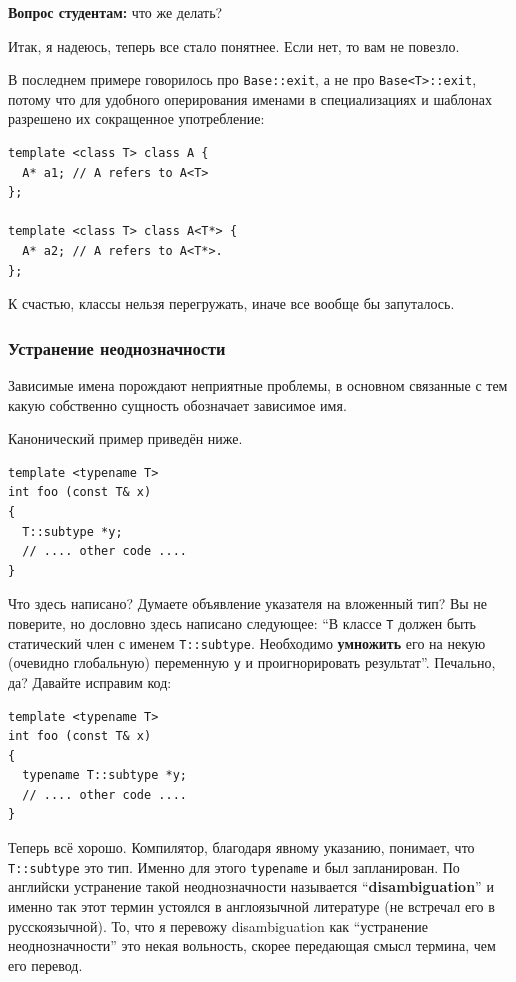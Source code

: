 \documentclass[a4paper,12pt,oneside]{article}
\newif\ifanswers
\begin{document}
\textbf{Вопрос студентам:} что же делать?

\ifanswers
Правильный ответ: сделать \lstinline!exit! зависимым именем, например явно употребив \lstinline!Base::exit()!
\fi

Итак, я надеюсь, теперь все стало понятнее. Если нет, то вам не повезло.

В последнем примере говорилось про \lstinline!Base::exit!, а не про \lstinline!Base<T>::exit!, потому что для удобного оперирования именами в специализациях и шаблонах разрешено их сокращенное употребление:

\begin{lstlisting}
template <class T> class A {
  A* a1; // A refers to A<T>
};

template <class T> class A<T*> {
  A* a2; // A refers to A<T*>.
};
\end{lstlisting}

К счастью, классы нельзя перегружать, иначе все вообще бы запуталось.

\subsubsection{Устранение неоднозначности}\label{FriendTypename}

Зависимые имена порождают неприятные проблемы, в основном связанные с тем какую собственно сущность обозначает зависимое имя.

Канонический пример приведён ниже.

\begin{lstlisting}
template <typename T>
int foo (const T& x)
{
  T::subtype *y;
  // .... other code ....
}
\end{lstlisting}

Что здесь написано? Думаете объявление указателя на вложенный тип? Вы не поверите, но дословно здесь написано 
следующее: ``В классе \lstinline!T! должен быть статический член с именем \lstinline!T::subtype!. Необходимо \textbf{умножить} его на некую (очевидно глобальную) переменную \lstinline!y! и проигнорировать результат''. Печально, да? Давайте исправим код:

\begin{lstlisting}
template <typename T>
int foo (const T& x)
{
  typename T::subtype *y;
  // .... other code ....
}
\end{lstlisting}

Теперь всё хорошо. Компилятор, благодаря явному указанию, понимает, что \lstinline!T::subtype! это тип. Именно для этого \lstinline!typename! и был запланирован. По английски устранение такой неоднозначности называется ``\textbf{disambiguation}''  и именно так этот термин устоялся в англоязычной литературе (не встречал его в русскоязычной). То, что я перевожу disambiguation как ``устранение неоднозначности'' это некая вольность, скорее передающая смысл термина, чем его перевод.
\end{document}

